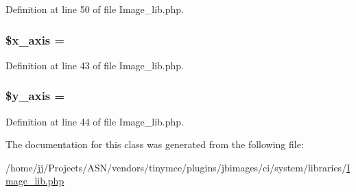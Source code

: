 Definition at line 50 of file Image\+\_\+lib.\+php.

\subsubsection[{\texorpdfstring{\$x\+\_\+axis}{$x_axis}}]{\setlength{\rightskip}{0pt plus 5cm}\$x\+\_\+axis = \textquotesingle{}\textquotesingle{}}\hypertarget{class_c_i___image__lib_a128914b11765a500690f876962196ca6}{}\label{class_c_i___image__lib_a128914b11765a500690f876962196ca6}


Definition at line 43 of file Image\+\_\+lib.\+php.

\subsubsection[{\texorpdfstring{\$y\+\_\+axis}{$y_axis}}]{\setlength{\rightskip}{0pt plus 5cm}\$y\+\_\+axis = \textquotesingle{}\textquotesingle{}}\hypertarget{class_c_i___image__lib_ac60512307da37068c0821f7dc2488608}{}\label{class_c_i___image__lib_ac60512307da37068c0821f7dc2488608}


Definition at line 44 of file Image\+\_\+lib.\+php.



The documentation for this class was generated from the following file\+:\begin{DoxyCompactItemize}
\item 
/home/jj/\+Projects/\+A\+S\+N/vendors/tinymce/plugins/jbimages/ci/system/libraries/\hyperlink{_image__lib_8php}{Image\+\_\+lib.\+php}\end{DoxyCompactItemize}
